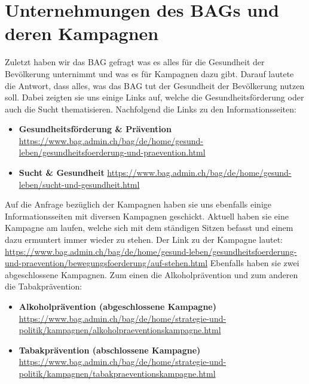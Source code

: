 \section{Unternehmungen des BAGs und deren Kampagnen}
Zuletzt haben wir das BAG gefragt was es alles für die Gesundheit der Bevölkerung unternimmt und was es für Kampagnen dazu gibt. Darauf lautete die Antwort, dass alles, was das BAG tut der Gesundheit der Bevölkerung nutzen soll. Dabei zeigten sie uns einige Links auf, welche die Gesundheitsförderung oder auch die Sucht thematisieren. Nachfolgend die Links zu den Informationsseiten:
\begin{itemize}
  \item \textbf{Gesundheitsförderung \& Prävention}
  \newline
  \url{https://www.bag.admin.ch/bag/de/home/gesund-leben/gesundheitsfoerderung-und-praevention.html}
  \item \textbf{Sucht \& Gesundheit}
  \newline
  \url{https://www.bag.admin.ch/bag/de/home/gesund-leben/sucht-und-gesundheit.html}
\end{itemize}
Auf die Anfrage bezüglich der Kampagnen haben sie uns ebenfalls einige Informationsseiten mit diversen Kampagnen geschickt. Aktuell haben sie eine Kampagne am laufen, welche sich mit dem ständigen Sitzen befasst und einem dazu ermuntert immer wieder zu stehen. Der Link zu der Kampagne lautet:
\newline
\url{https://www.bag.admin.ch/bag/de/home/gesund-leben/gesundheitsfoerderung-und-praevention/bewegungsfoerderung/auf-stehen.html}
\newline
Ebenfalls haben sie zwei abgeschlossene Kampagnen. Zum einen die Alkoholprävention und zum anderen die Tabakprävention:
\begin{itemize}
  \item \textbf{Alkoholprävention (abgeschlossene Kampagne)}
  \newline
  \url{https://www.bag.admin.ch/bag/de/home/strategie-und-politik/kampagnen/alkoholpraeventionskampagne.html}
  \item \textbf{Tabakprävention (abschlossene Kampagne)}
  \newline
  \url{https://www.bag.admin.ch/bag/de/home/strategie-und-politik/kampagnen/tabakpraeventionskampagne.html}
\end{itemize}